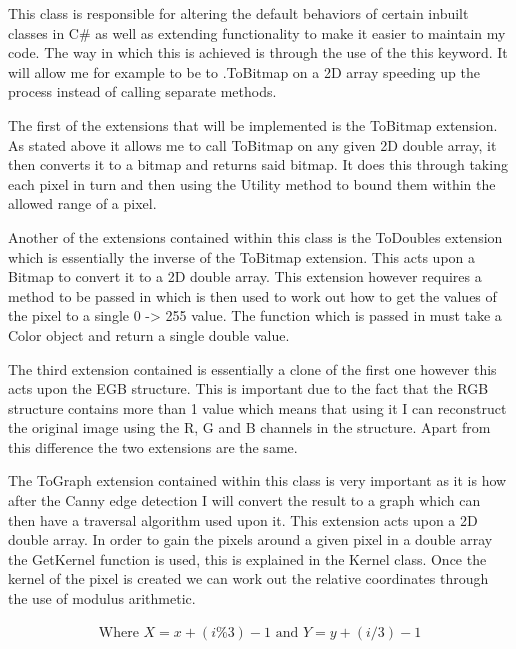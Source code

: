 \begin{FlushLeft}
    This class is responsible for altering the default behaviors of certain inbuilt classes in C# as well as extending functionality to make it easier to maintain my code. The way in which this is achieved is through the use of the this keyword. It will allow me for example to be to .ToBitmap on a 2D array speeding up the process instead of calling separate methods.\\ \bk

    The first of the extensions that will be implemented is the ToBitmap extension. As stated above it allows me to call ToBitmap on any given 2D double array, it then converts it to a bitmap and returns said bitmap. It does this through taking each pixel in turn and then using the Utility method to bound them within the allowed range of a pixel. \\ \bk

    Another of the extensions contained within this class is the ToDoubles extension which is essentially the inverse of the ToBitmap extension. This acts upon a Bitmap to convert it to a 2D double array. This extension however requires a method to be passed in which is then used to work out how to get the values of the pixel to a single 0 -> 255 value. The function which is passed in must take a Color object and return a single double value. \\ \bk

    The third extension contained is essentially a clone of the first one however this acts upon the EGB structure. This is important due to the fact that the RGB structure contains more than 1 value which means that using it I can reconstruct the original image using the R, G and B channels in the structure. Apart from this difference the two extensions are the same. \\ \bk

    The ToGraph extension contained within this class is very important as it is how after the Canny edge detection I will convert the result to a graph which can then have a traversal algorithm used upon it. This extension acts upon a 2D double array. In order to gain the pixels around a given pixel in a double array the GetKernel function is used, this is explained in the Kernel class. Once the kernel of the pixel is created we can work out the relative coordinates through the use of modulus arithmetic.

    \begin{gather*}
        \text{Where } X = x + (i \% 3) -1 \text{ and } Y = y + (i / 3) - 1 \\
    \end{gather*} \\ 


\end{FlushLeft}
